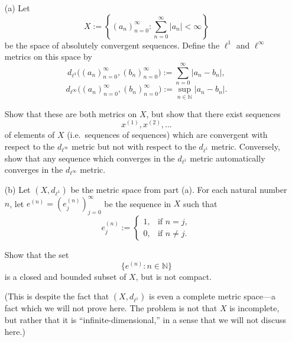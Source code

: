 \begin{problem}[16pts]
  \vphantom{text}
  \begin{enumerate}
  \item[(a)] Let
\[
X := \left\{ (a_n)_{n=0}^\infty : \sum_{n=0}^\infty |a_n| < \infty \right\}
\]
be the space of absolutely convergent sequences. Define the $\ell^1$ and $\ell^\infty$ metrics on this space by
\[
d_{\ell^1}\big((a_n)_{n=0}^\infty,(b_n)_{n=0}^\infty\big)
:= \sum_{n=0}^\infty |a_n - b_n|,
\]
\[
d_{\ell^\infty}\big((a_n)_{n=0}^\infty,(b_n)_{n=0}^\infty\big)
:= \sup_{n\in\mathbb{N}} |a_n - b_n|.
\]

Show that these are both metrics on $X$, but show that there exist sequences 
\[
x^{(1)}, x^{(2)}, \dots
\]
of elements of $X$ (i.e.\ sequences of sequences) which are convergent with respect to the $d_{\ell^\infty}$ metric but not with respect to the $d_{\ell^1}$ metric. Conversely, show that any sequence which converges in the $d_{\ell^1}$ metric automatically converges in the $d_{\ell^\infty}$ metric.


 \item[(b)] Let $(X,d_{\ell^1})$ be the metric space from part (a).  
For each natural number $n$, let $e^{(n)} = (e^{(n)}_j)_{j=0}^\infty$ be the sequence in $X$ such that  
\[
e^{(n)}_j := 
\begin{cases}
1, & \text{if } n=j,\\
0, & \text{if } n\neq j.
\end{cases}
\]

Show that the set
\[
\{ e^{(n)} : n \in \mathbb{N} \}
\]
is a closed and bounded subset of $X$, but is not compact.  

(This is despite the fact that $(X,d_{\ell^1})$ is even a complete metric space---a fact which we will not prove here.  
The problem is not that $X$ is incomplete, but rather that it is ``infinite-dimensional,'' in a sense that we will not discuss here.)

 
  \end{enumerate}
\end{problem}

